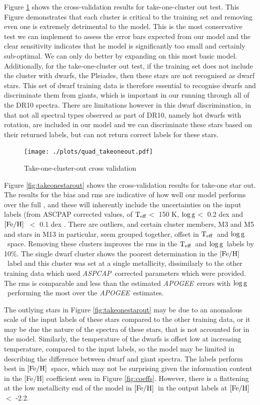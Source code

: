 \documentclass[12pt, preprint]{aastex}
\newcommand{\teff}{\mbox{$\rm T_{eff}$}}
\newcommand{\feh}{\mbox{$\rm [Fe/H]$}}
\newcommand{\logg}{\mbox{$\rm \log g$}}
\newcommand{\apogee}{\textsl{APOGEE}}
\newcommand{\aspcap}{\textsl{ASPCAP}}
\begin{document}
Figure \ref{fig:takeoneout} shows the cross-validation results for take-one-cluster out test. This Figure demonstrates that each cluster is critical to the training set and removing even one is extremely detrimental to the model. This is the most conservative test we can implement to assess the error bars expected from our model and the clear sensitivity indicates that he model is significantly too small and certainly sub-optimal. We can only do better by expanding on this most basic model. Additionally, for the take-one-cluster out test, if the training set does not include the cluster with dwarfs, the Pleiades, then these stars are not recognised as dwarf stars. This set of dwarf training data is therefore essential to recognise dwarfs and discriminate them from giants, which is important in our running through all of the DR10 spectra. There are limitations however in this dwarf discrimination, in that not all spectral types observed as part of DR10, namely hot dwarfs with rotation, are included in our model and we can discriminate these stars based on their returned labels, but can not return correct labels for these stars. 

\begin{figure}[h!]
\centering
  \texttt{[image: ./plots/quad\_takeoneout.pdf]}
\caption{Take-one-cluster-out cross validation}
\label{fig:takeoneout}
\end{figure}

Figure \ref{fig:takeonestarout} shows the cross-validation results for take-one star out. The results for the bias and rms are indicative of how well our model performs over the full , and these will inherently include the uncertainties on the input labels (from ASCPAP corrected values, of \teff $<$ 150 K, \logg $<$ 0.2 dex and \feh\ $<$ 0.1 dex \citep{Meszaros2013}. There are outliers, and certain cluster members, M3 and M5 and stars in M13 in particular, seem grouped together, offset in \teff\ and \logg\ space. Removing these clusters improves the rms in the \teff\ and \logg\ labels by 10\%. The single dwarf cluster shows the poorest determination in the \feh\ label and this cluster was set at a single metallicity, dissimilarly to the other training data which used \aspcap\ corrected parameters which were provided. The rms is comparable and less than the estimated \apogee\ errors with \logg\ performing the most over the \apogee\ estimates.  

The outlying stars in Figure \ref{fig:takeonestarout} may be due to an anomalous scale of the input labels of these stars compared to the other training data, or it may be due the nature of the spectra of these stars, that is not accounted for in the model. Similarly, the temperature of the dwarfs is offset low at increasing temperature, compared to the input labels, so the model may be limited in describing the difference between dwarf and giant spectra. The labels perform best in \feh\ space, which may not be surprising given the information content in the [Fe/H] coefficient seen in Figure \ref{fig:coeffs}. However, there is a flattening at the low metallicity end of the model in \feh\ in the output labels at \feh\ $<$ -2.2. 
\end{document}
